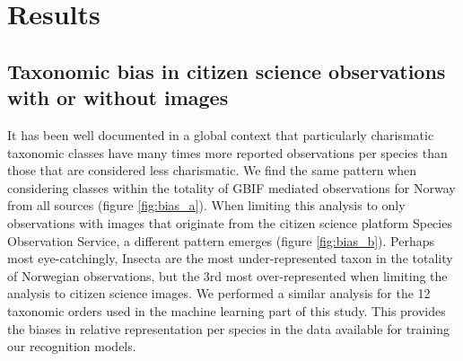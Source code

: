 \documentclass{article}
\begin{document}
\section*{Results}
\subsection*{Taxonomic bias in citizen science observations with or without images}
It has been well documented in a global context that particularly charismatic taxonomic classes have many times more reported observations per species than those that are considered less charismatic\autocite{Troudet2017}. We find the same pattern when considering classes within the totality of GBIF mediated observations for Norway from all sources (figure \ref{fig:bias_a}). When limiting this analysis to only observations with images that originate from the citizen science platform Species Observation Service\autocite{GBIF_dataset}, a different pattern emerges (figure \ref{fig:bias_b}). Perhaps most eye-catchingly, Insecta are the most under-represented taxon in the totality of Norwegian observations, but the 3rd most over-represented when limiting the analysis to citizen science images. We performed a similar analysis for the 12 taxonomic orders used in the machine learning part of this study. This provides the biases in relative representation per species in the data available for training our recognition models.
\end{document}
